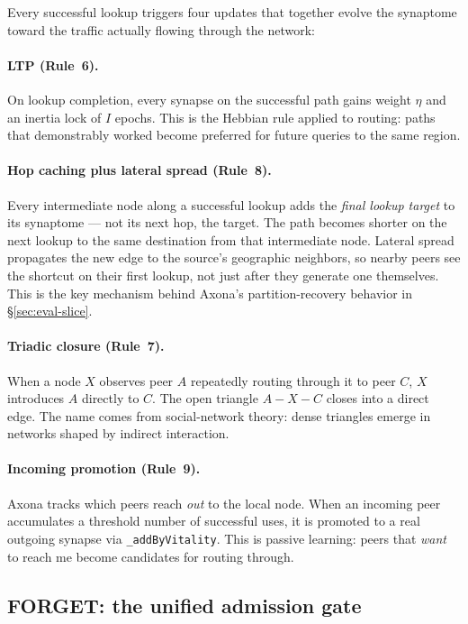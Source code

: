 \documentclass[conference]{IEEEtran}
\newcommand{\axona}{Axona\xspace}
\begin{document}
Every successful lookup triggers four updates that together evolve the
synaptome toward the traffic actually flowing through the network:

\paragraph{LTP (Rule~6).}
On lookup completion, every synapse on the successful path gains weight
$\eta$ and an inertia lock of $I$ epochs. This is the Hebbian rule applied
to routing: paths that demonstrably worked become preferred for future
queries to the same region.

\paragraph{Hop caching plus lateral spread (Rule~8).}
Every intermediate node along a successful lookup adds the
\emph{final lookup target} to its synaptome --- not its next hop, the
target. The path becomes shorter on the next lookup to the same
destination from that intermediate node. Lateral spread propagates the
new edge to the source's geographic neighbors, so nearby peers see the
shortcut on their first lookup, not just after they generate one
themselves. This is the key mechanism behind \axona's partition-recovery
behavior in \S\ref{sec:eval-slice}.

\paragraph{Triadic closure (Rule~7).}
When a node $X$ observes peer $A$ repeatedly routing through it to peer
$C$, $X$ introduces $A$ directly to $C$. The open triangle
$A \!-\! X \!-\! C$ closes into a direct edge. The name comes from
social-network theory: dense triangles emerge in networks shaped by
indirect interaction.

\paragraph{Incoming promotion (Rule~9).}
\axona tracks which peers reach \emph{out} to the local node. When an
incoming peer accumulates a threshold number of successful uses, it is
promoted to a real outgoing synapse via \texttt{\_addByVitality}. This is
passive learning: peers that \emph{want} to reach me become candidates
for routing through.

\subsection{FORGET: the unified admission gate}
\label{sec:nh1-forget}
\end{document}
